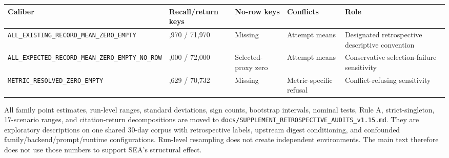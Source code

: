 \documentclass[
  11pt]{article}
\begin{document}
\begin{longtable}[]{@{}
  >{\raggedright\arraybackslash}p{}
  >{\raggedleft\arraybackslash}p{}
  >{\raggedright\arraybackslash}p{}
  >{\raggedright\arraybackslash}p{}
  >{\raggedright\arraybackslash}p{}@{}}
\toprule\noalign{}
\begin{minipage}[b]{\linewidth}\raggedright
Caliber
\end{minipage} & \begin{minipage}[b]{\linewidth}\raggedleft
Recall/return keys
\end{minipage} & \begin{minipage}[b]{\linewidth}\raggedright
No-row keys
\end{minipage} & \begin{minipage}[b]{\linewidth}\raggedright
Conflicts
\end{minipage} & \begin{minipage}[b]{\linewidth}\raggedright
Role
\end{minipage} \\
\midrule\noalign{}
\endhead
\bottomrule\noalign{}
\endlastfoot
\texttt{ALL\_EXISTING\_}\allowbreak \texttt{RECORD\_MEAN\_}\allowbreak \texttt{ZERO\_EMPTY}
& 71,970 / 71,970 & Missing & Attempt means & Designated retrospective
descriptive convention \\
\texttt{ALL\_EXPECTED\_}\allowbreak \texttt{RECORD\_MEAN\_}\allowbreak \texttt{ZERO\_EMPTY\_}\allowbreak \texttt{NO\_ROW}
& 72,000 / 72,000 & Selected-proxy zero & Attempt means & Conservative
selection-failure sensitivity \\
\texttt{METRIC\_RESOLVED\_}\allowbreak \texttt{ZERO\_EMPTY} & 71,629 /
70,732 & Missing & Metric-specific refusal & Conflict-refusing
sensitivity \\
\end{longtable}

All family point estimates, run-level ranges, standard deviations, sign
counts, bootstrap intervals, nominal tests, Rule A, strict-singleton,
17-scenario ranges, and citation-return decompositions are moved to
\texttt{docs/SUPPLEMENT\_RETROSPECTIVE\_AUDITS\_v1.15.md}. They are
exploratory descriptions on one shared 30-day corpus with retrospective
labels, upstream digest conditioning, and confounded
family/backend/prompt/runtime configurations. Run-level resampling does
not create independent environments. The main text therefore does not
use those numbers to support SEA's structural effect.
\end{document}
